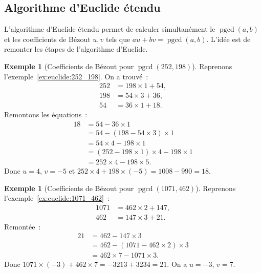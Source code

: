 \documentclass[12pt,a4paper,openany]{book}
\theoremstyle{definition}
\newtheorem{exemple}[definition]{Exemple}
\theoremstyle{plain}
\theoremstyle{remark}
\DeclareMathOperator{\pgcd}{pgcd}
\begin{document}
\subsection{Algorithme d'Euclide étendu}
\label{subsec:ch1:euclide_etendu}


L'algorithme d'Euclide étendu permet de calculer simultanément le $\pgcd(a,b)$ et les
coefficients de Bézout $u, v$ tels que $au + bv = \pgcd(a,b)$. L'idée est de
remonter les étapes de l'algorithme d'Euclide.

\begin{exemple}[Coefficients de Bézout pour $\pgcd(252, 198)$]
\label{ex:bezout:252_198}
Reprenons l'exemple~\ref{ex:euclide:252_198}. On a trouvé~:
\begin{align*}
  252 &= 198 \times 1 + 54, \\
  198 &= 54 \times 3 + 36, \\
  54  &= 36 \times 1 + 18.
\end{align*}
Remontons les équations~:
\begin{align*}
  18 &= 54 - 36 \times 1 \\
     &= 54 - (198 - 54 \times 3) \times 1 \\
     &= 54 \times 4 - 198 \times 1 \\
     &= (252 - 198 \times 1) \times 4 - 198 \times 1 \\
     &= 252 \times 4 - 198 \times 5.
\end{align*}
Donc $u = 4$, $v = -5$ et $252 \times 4 + 198 \times (-5) = 1008 - 990 = 18$.
\end{exemple}

\begin{exemple}[Coefficients de Bézout pour $\pgcd(1071, 462)$]
\label{ex:bezout:1071_462}
Reprenons l'exemple~\ref{ex:euclide:1071_462}~:
\begin{align*}
  1071 &= 462 \times 2 + 147, \\
  462  &= 147 \times 3 + 21.
\end{align*}
Remontée~:
\begin{align*}
  21 &= 462 - 147 \times 3 \\
     &= 462 - (1071 - 462 \times 2) \times 3 \\
     &= 462 \times 7 - 1071 \times 3.
\end{align*}
Donc $1071 \times (-3) + 462 \times 7 = -3213 + 3234 = 21$. On a $u = -3$, $v = 7$.
\end{exemple}
\end{document}
